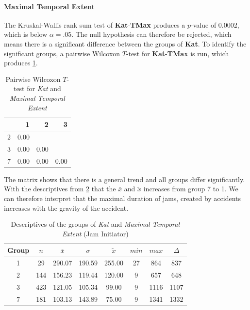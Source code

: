 \paragraph{Maximal Temporal Extent}
The Kruskal-Wallis rank sum test of \textbf{Kat}-\textbf{TMax} produces a $p$-value of 0.0002, which is below $\alpha=.05$. The null hypothesis can therefore be rejected, which means there is a significant difference between the groups of \textbf{Kat}. To identify the significant groups, a pairwise Wilcoxon $T$-test for \textbf{Kat}-\textbf{TMax} is run, which produces \cref{tbl:wilcoxon_baysis_initiator_Kat_TMax}. 
\begin{table}[ht]
	\centering
	\begin{tabular}{rrrr}
		\toprule  
  		& 1 & 2 & 3 \\ 
  		\midrule    
        2 & 0.00 &  &  \\ 
        3 & 0.00 & 0.00 &  \\ 
        7 & 0.00 & 0.00 & 0.00 \\ 
 		\bottomrule
	\end{tabular}
    \caption{Pairwise Wilcoxon $T$-test for \textit{Kat} and \textit{Maximal Temporal Extent}}
    \label{tbl:wilcoxon_baysis_initiator_Kat_TMax}
\end{table}
The matrix shows that there is a general trend and all groups differ significantly. With the descriptives from \cref{tbl:descriptives_baysis_initiator_Kat_TMax} that the $\bar{x}$ and $\tilde{x}$ increases from group 7 to 1. We can therefore interpret that the maximal duration of jams, created by accidents increases with the gravity of the accident.
\begin{table}[ht]
	\centering
	\begin{tabular}{c|c|c|c|c|c|c|c}
		\toprule  
		Group & $n$ & $\bar{x}$ & $\sigma$ & $\tilde{x}$ & $min$ & $max$ & $\Delta$ \\
        \midrule
        1 & 29  & 290.07 & 190.59 & 255.00 & 27 & 864  & 837 \\ 
        2 & 144 & 156.23 & 119.44 & 120.00 & 9  & 657  & 648 \\ 
        3 & 423 & 121.05 & 105.34 & 99.00  & 9  & 1116 & 1107 \\ 
        7 & 181 & 103.13 & 143.89 & 75.00  & 9  & 1341 & 1332 \\ 
 		\bottomrule
	\end{tabular}
    \caption{Descriptives of the groups of \textit{Kat} and \textit{Maximal Temporal Extent} (Jam Initiator)}
    \label{tbl:descriptives_baysis_initiator_Kat_TMax}
\end{table}

